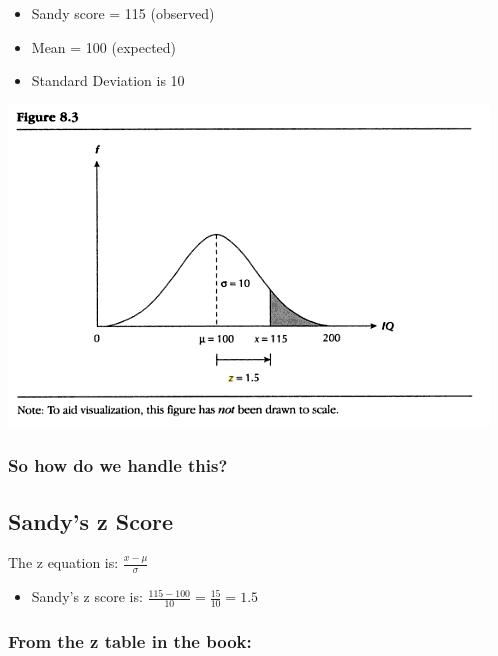 \documentclass[]{article}
\begin{document}
\begin{itemize}
\itemsep1pt\parskip0pt
\item
  Sandy score = 115 (observed)
\item
  Mean = 100 (expected)
\item
  Standard Deviation is 10
\end{itemize}

\includegraphics{sandy1.png}

\subsubsection{So how do we handle
this?}\label{so-how-do-we-handle-this}

\subsection{Sandy's z Score}\label{sandys-z-score}

The z equation is: $\frac{x - \mu}{\sigma}$

\begin{itemize}
\itemsep1pt\parskip0pt
\item
  Sandy's z score is: $\frac{115 - 100}{10}=\frac{15}{10}=1.5$
\end{itemize}

\subsubsection{From the z table in the
book:}\label{from-the-z-table-in-the-book}
\end{document}
